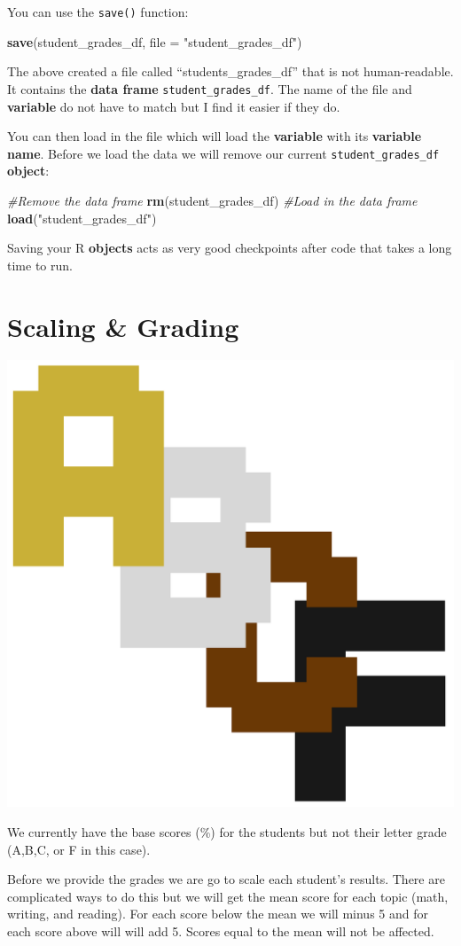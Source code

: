 \documentclass[]{book}
\newenvironment{Shaded}{\begin{snugshade}}{\end{snugshade}}
\newcommand{\KeywordTok}[1]{\textcolor[rgb]{0.13,0.29,0.53}{\textbf{#1}}}
\newcommand{\DataTypeTok}[1]{\textcolor[rgb]{0.13,0.29,0.53}{#1}}
\newcommand{\StringTok}[1]{\textcolor[rgb]{0.31,0.60,0.02}{#1}}
\newcommand{\CommentTok}[1]{\textcolor[rgb]{0.56,0.35,0.01}{\textit{#1}}}
\newcommand{\NormalTok}[1]{#1}
\begin{document}
You can use the \texttt{save()} function:

\begin{Shaded}
\begin{Highlighting}[]
\KeywordTok{save}\NormalTok{(student_grades_df, }\DataTypeTok{file =} \StringTok{"student_grades_df"}\NormalTok{)}
\end{Highlighting}
\end{Shaded}

The above created a file called ``students\_grades\_df'' that is not
human-readable. It contains the \textbf{data frame}
\texttt{student\_grades\_df}. The name of the file and \textbf{variable}
do not have to match but I find it easier if they do.

You can then load in the file which will load the \textbf{variable} with
its \textbf{variable name}. Before we load the data we will remove our
current \texttt{student\_grades\_df} \textbf{object}:

\begin{Shaded}
\begin{Highlighting}[]
\CommentTok{#Remove the data frame}
\KeywordTok{rm}\NormalTok{(student_grades_df)}
\CommentTok{#Load in the data frame}
\KeywordTok{load}\NormalTok{(}\StringTok{"student_grades_df"}\NormalTok{)}
\end{Highlighting}
\end{Shaded}

Saving your R \textbf{objects} acts as very good checkpoints after code
that takes a long time to run.

\section{Scaling \& Grading}\label{scaling-grading}

\begin{center}\includegraphics[width=0.2\linewidth]{figures/letter_grades} \end{center}

We currently have the base scores (\%) for the students but not their
letter grade (A,B,C, or F in this case).

Before we provide the grades we are go to scale each student's results.
There are complicated ways to do this but we will get the mean score for
each topic (math, writing, and reading). For each score below the mean
we will minus 5 and for each score above will will add 5. Scores equal
to the mean will not be affected.
\end{document}
